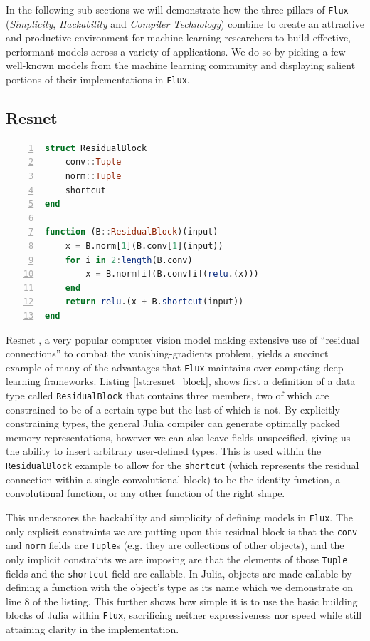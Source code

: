\documentclass{juliacon}
\begin{document}
In the following sub-sections we will demonstrate how the three pillars of \texttt{Flux} (\textit{Simplicity}, \textit{Hackability} and \textit{Compiler Technology}) combine to create an attractive and productive environment for machine learning researchers to build effective, performant models across a variety of applications.  We do so by picking a few well-known models from the machine learning community and displaying salient portions of their implementations in \texttt{Flux}.

\subsection{Resnet}

\begin{lstlisting}[language = Julia,
                  label={lst:resnet_block},
                  caption={A resnet block in \texttt{Flux}},
                  captionpos=b,
                  numbers=left,]
struct ResidualBlock
    conv::Tuple
    norm::Tuple
    shortcut
end

function (B::ResidualBlock)(input)
    x = B.norm[1](B.conv[1](input))
    for i in 2:length(B.conv)
        x = B.norm[i](B.conv[i](relu.(x)))
    end
    return relu.(x + B.shortcut(input))
end
\end{lstlisting}

Resnet \cite{resnet}, a very popular computer vision model making extensive use of ``residual connections'' to combat the vanishing-gradients problem, yields a succinct example of many of the advantages that \texttt{Flux} maintains over competing deep learning frameworks.  Listing \ref{lst:resnet_block}, shows first a definition of a data type called \texttt{ResidualBlock} that contains three members, two of which are constrained to be of a certain type but the last of which is not.  By explicitly constraining types, the general Julia compiler can generate optimally packed memory representations, however we can also leave fields unspecified, giving us the ability to insert arbitrary user-defined types.  This is used within the \texttt{ResidualBlock} example to allow for the \texttt{shortcut} (which represents the residual connection within a single convolutional block) to be the identity function, a convolutional function, or any other function of the right shape.

This underscores the hackability and simplicity of defining models in \texttt{Flux}.  The only explicit constraints we are putting upon this residual block is that the \texttt{conv} and \texttt{norm} fields are \texttt{Tuple}s (e.g. they are collections of other objects), and the only implicit constraints we are imposing are that the elements of those \texttt{Tuple} fields and the \texttt{shortcut} field are callable.  In Julia, objects are made callable by defining a function with the object's type as its name which we demonstrate on line 8 of the listing.  This further shows how simple it is to use the basic building blocks of Julia within \texttt{Flux}, sacrificing neither expressiveness nor speed while still attaining clarity in the implementation.
\end{document}
